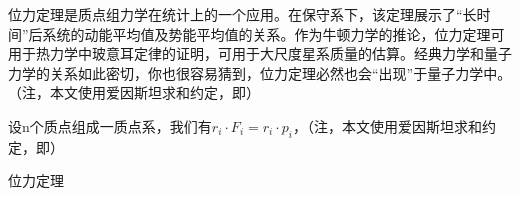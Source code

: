 位力定理是质点组力学在统计上的一个应用。在保守系下，该定理展示了“长时间”后系统的动能平均值及势能平均值的关系。作为牛顿力学的推论，位力定理可用于热力学中玻意耳定律的证明，可用于大尺度星系质量的估算。经典力学和量子力学的关系如此密切，你也很容易猜到，位力定理必然也会“出现”于量子力学中。（注，本文使用爱因斯坦求和约定，即）

设n个质点组成一质点系，我们有$r_i\cdot F_i=r_i\cdot p_i$，（注，本文使用爱因斯坦求和约定，即）
\begin{theorem}{位力定理}

\end{theorem}

